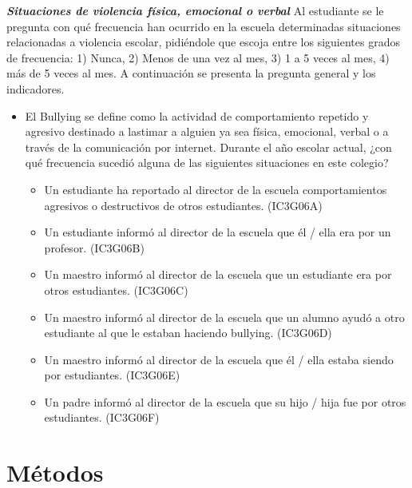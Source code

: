 \documentclass[12pt,twoside]{templates/facsothesis}
\providecommand{\tightlist}{%
  \setlength{\itemsep}{0pt}\setlength{\parskip}{0pt}}
\begin{document}
\textbf{\emph{Situaciones de violencia física, emocional o verbal}}
Al estudiante se le pregunta con qué frecuencia han ocurrido en la escuela determinadas situaciones relacionadas a violencia escolar, pidiéndole que escoja entre los siguientes grados de frecuencia: 1) Nunca, 2) Menos de una vez al mes, 3) 1 a 5 veces al mes, 4) más de 5 veces al mes. A continuación se presenta la pregunta general y los indicadores.

\begin{itemize}
\item
  El Bullying se define como la actividad de comportamiento repetido y agresivo destinado a lastimar a alguien ya sea física, emocional, verbal o a través de la comunicación por internet. Durante el año escolar actual, ¿con qué frecuencia sucedió alguna de las siguientes situaciones en este colegio?

  \begin{itemize}
  \tightlist
  \item
    Un estudiante ha reportado al director de la escuela comportamientos agresivos o destructivos de otros estudiantes. (IC3G06A)
  \item
    Un estudiante informó al director de la escuela que él / ella era por un profesor. (IC3G06B)
  \item
    Un maestro informó al director de la escuela que un estudiante era por otros estudiantes. (IC3G06C)
  \item
    Un maestro informó al director de la escuela que un alumno ayudó a otro estudiante al que le estaban haciendo bullying. (IC3G06D)
  \item
    Un maestro informó al director de la escuela que él / ella estaba siendo por estudiantes. (IC3G06E)
  \item
    Un padre informó al director de la escuela que su hijo / hija fue por otros estudiantes. (IC3G06F)
  \end{itemize}
\end{itemize}

\hypertarget{muxe9todos}{%
\section{Métodos}\label{muxe9todos}}
\end{document}
